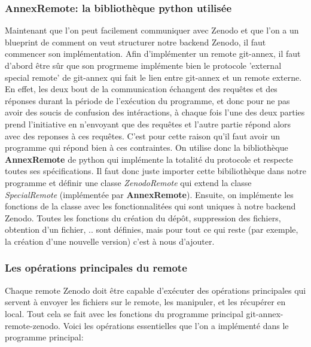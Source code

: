 \documentclass[11pt]{article}
\begin{document}
\subsubsection{AnnexRemote: la bibliothèque python utilisée}
\label{sec:org507bb3d}
Maintenant que l'on peut facilement communiquer avec Zenodo et que
l'on a un blueprint de comment on veut structurer notre backend
Zenodo, il faut commencer son implémentation.
Afin d'implémenter un remote git-annex, il faut d'abord être sûr que
son progrmeme implémente bien le protocole 'external special remote' de
git-annex qui fait le lien entre git-annex et un remote externe. En
effet, les deux bout de la communication échangent des requêtes et des
réponses durant la période de l'exécution du programme, et donc pour
ne pas avoir des soucis de confusion des intéractions, à chaque fois
l'une des deux parties prend l'initiative en n'envoyant que des
requêtes et l'autre partie répond alors avec des reponses à ces requêtes. 
C'est pour cette raison qu'il faut avoir un programme qui répond bien
à ces contraintes. On utilise donc la bibliothèque \textbf{AnnexRemote} de
python qui implémente la totalité du protocole et respecte toutes ses
spécifications. Il faut donc juste importer cette bibiliothèque dans
notre programme et définir une classe \emph{ZenodoRemote} qui extend la classe
\emph{SpecialRemote} (implémentée par \textbf{AnnexRemote}). Ensuite, on implémente
les fonctions de la classe avec les fonctionnalitées qui sont uniques
à notre backend Zenodo. Toutes les fonctions du création du dépôt,
suppression des fichiers, obtention d'un fichier, .. sont définies,
mais pour tout ce qui reste (par exemple, la création d'une nouvelle
version) c'est à nous d'ajouter.

\subsubsection{Les opérations principales du remote}
\label{sec:orgc0aceec}
Chaque remote Zenodo doit être capable d'exécuter des opérations
principales qui servent à envoyer les fichiers sur le remote, les
manipuler, et les récupérer en local. Tout cela se fait avec les
fonctions du programme principal git-annex-remote-zenodo. Voici les
opérations essentielles que l'on a implémenté dans le programme
principal:
\end{document}

